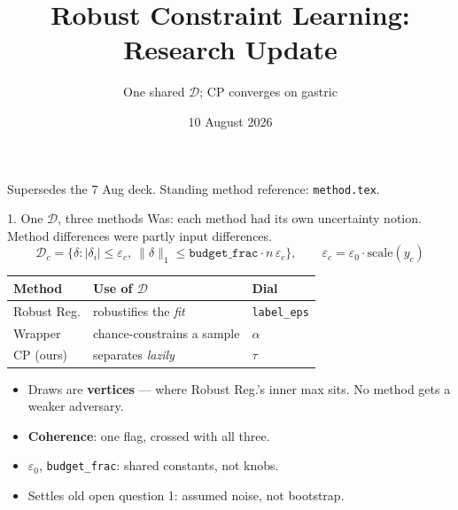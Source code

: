 \documentclass{beamer}
\title{Robust Constraint Learning: Research Update}
\subtitle{One shared $\mathcal{D}$; CP converges on gastric}
\date{10 August 2026}
\begin{document}
\begin{frame}
  \titlepage
  \begin{center}\footnotesize
  Supersedes the 7 Aug deck. Standing method reference: \texttt{method.tex}.
  \end{center}
\end{frame}

\begin{frame}{1. One $\mathcal{D}$, three methods}
  \small
  Was: each method had its own uncertainty notion. Method differences were partly
  input differences.
  \[
    \mathcal D_c = \{\delta: |\delta_i|\le\varepsilon_c,\ \lVert\delta\rVert_1 \le
      \texttt{budget\_frac}\cdot n\,\varepsilon_c\},
    \qquad \varepsilon_c = \varepsilon_0\cdot\mathrm{scale}(y_c)
  \]
  \begin{center}\small
  \begin{tabular}{@{}lll@{}}
    \toprule
    Method & Use of $\mathcal D$ & Dial \\
    \midrule
    Robust Reg. & robustifies the \emph{fit}       & \texttt{label\_eps} \\
    Wrapper     & chance-constrains a sample       & $\alpha$ \\
    CP (ours)   & separates \emph{lazily}          & $\tau$ \\
    \bottomrule
  \end{tabular}
  \end{center}
  \medskip
  \begin{itemize}
    \item Draws are \textbf{vertices} --- where Robust Reg.'s inner max sits. No
      method gets a weaker adversary.
    \item \textbf{Coherence}: one flag, crossed with all three.
    \item $\varepsilon_0$, \texttt{budget\_frac}: shared constants, not knobs.
    \item Settles old open question 1: assumed noise, not bootstrap.
  \end{itemize}
\end{frame}
\end{document}

